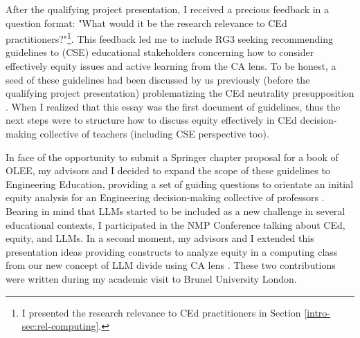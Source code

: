 After the qualifying project presentation, I received a precious feedback in a question format: "What would it be the research relevance to \gls{CEd} practitioners?"\footnote{I presented the research relevance to \gls{CEd} practitioners in Section \ref{intro-sec:rel-computing}.}. This feedback led me to include \gls{RG}3 seeking recommending guidelines to (\gls{CSE}) educational stakeholders concerning how to consider effectively equity issues and active learning from the \acrfull{CA} lens. To be honest, a seed of these guidelines had been discussed by us previously (before the qualifying project presentation) problematizing the \gls{CEd} neutrality presupposition \cite{bispojr:2022-educomp}. When I realized that this essay was the first document of guidelines, thus the next steps were to structure how to discuss equity effectively in \gls{CEd} decision-making collective of teachers (including \gls{CSE} perspective too).

In face of the opportunity to submit a Springer chapter proposal for a book of \gls{OLEE}, my advisors and I decided to expand the scope of these guidelines to Engineering Education, providing a set of guiding questions to orientate an initial equity analysis for an Engineering decision-making collective of professors \cite{bispojr:2024-online-lab}. Bearing in mind that \glspl{LLM} started to be included as a new challenge in several educational contexts, I participated in the \gls{NMP} Conference talking about \gls{CEd}, equity, and \glspl{LLM}. In a second moment, my advisors and I extended this presentation ideas providing constructs to analyze equity in a computing class from our new concept of \gls{LLM} divide using \gls{CA} lens \cite{bispojr:2024-nmp}. These two contributions were written during my academic visit to Brunel University London.

